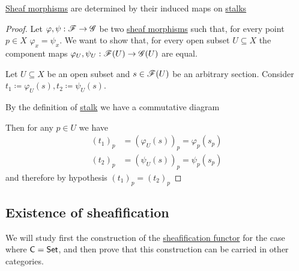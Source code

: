 \documentclass[../../../main]{subfiles}
\begin{document}
\begin{proposition}\label{prop:sheaf-morphism-and-stalks}
  \hyperref[def:sheaf]{Sheaf morphisms} are determined by their induced maps on \hyperref[def:stalk-sheaf]{stalks}
\end{proposition}
\begin{proof}
  Let \(\varphi, \psi: \mathscr{F} \to \mathscr{G}\) be two \hyperref[def:sheaf]{sheaf morphisms} such that, for every point \(p \in X\) \(\varphi_{x} = \psi_{x}\). We want to show that, for every open subset \(U \subseteq X\) the component maps \(\varphi_{U}, \psi_{U}: \mathscr{F}(U) \to \mathscr{G}(U)\) are equal.

  Let \(U \subseteq X\) be an open subset and \(s \in \mathscr{F}(U)\) be an arbitrary section.
  Consider \(t_{1} \coloneq \varphi_{U}(s), t_{2} \coloneq \psi_{U}(s)\).

  By the definition of \hyperref[def:stalk-sheaf]{stalk} we have a commutative diagram
  \begin{center}
  \end{center}
  Then for any \(p \in U\) we have
  \begin{align*}
    (t_{1})_{p} &= (\varphi_{U}(s))_{p} = \varphi_{p}(s_{p}) \\
    (t_{2})_{p} &= (\psi_{U}(s))_{p} = \psi_{p}(s_{p})
  \end{align*}
  and therefore by hypothesis \((t_{1})_{p} = (t_{2})_{p}\)
\end{proof}



\subsection*{Existence of sheafification}
We will study first the construction of the \hyperref[def:sheafification]{sheafification functor} for the case where \(\mathsf{C} = \mathsf{Set}\), and then prove that this construction can be carried in other categories.
\end{document}
